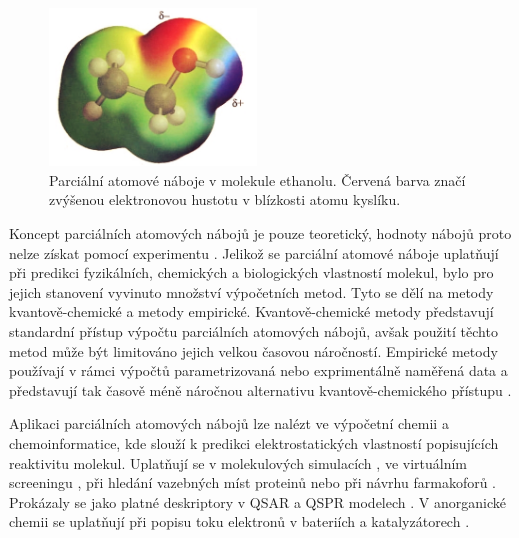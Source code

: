 \bigskip
\begin{figure}[h]
\begin{center}
\includegraphics[width=5.5cm]{pictures/partial_atomic_charges_cropped.jpg}
\caption{Parciální atomové náboje v molekule ethanolu. Červená barva značí zvýšenou elektronovou hustotu v blízkosti atomu kyslíku.}
\end{center}
\end{figure}
Koncept parciálních atomových nábojů je pouze teoretický, hodnoty nábojů proto nelze získat pomocí experimentu \cite{Leach}. Jelikož se parciální atomové náboje uplatňují při predikci fyzikálních, chemických a biologických vlastností molekul, bylo pro jejich stanovení vyvinuto množství výpočetních metod. Tyto se dělí na metody kvantově-chemi\-cké a metody empirické. Kvantově-chemické metody představují standardní přístup výpočtu parciálních atomových nábojů,  avšak použití těchto metod může být limitováno jejich velkou časovou náročností. Empirické metody používají v rámci výpočtů parametrizovaná nebo exprimentálně naměřená data a představují tak časově méně náročnou alternativu kvantově-chemického přístupu \cite{Gasteiger:Textbook}. 

Aplikaci parciálních atomových nábojů lze nalézt ve výpočetní chemii a chemoinformatice, kde slouží k predikci elektrostatických vlastností popisujících reaktivitu molekul. Uplatňují se v molekulových simulacích \cite{molsimul}, ve virtuálním screeningu \cite{virtscreen}, při hledání vazebných míst proteinů nebo při návrhu farmakoforů \cite{farmak}. Prokázaly se jako platné deskriptory v QSAR a QSPR modelech \cite{Ghaf:QSAR, QSPR2}. V anorganické chemii se uplatňují při popisu toku elektronů v bateriích a katalyzátorech \cite{innorg}. 

